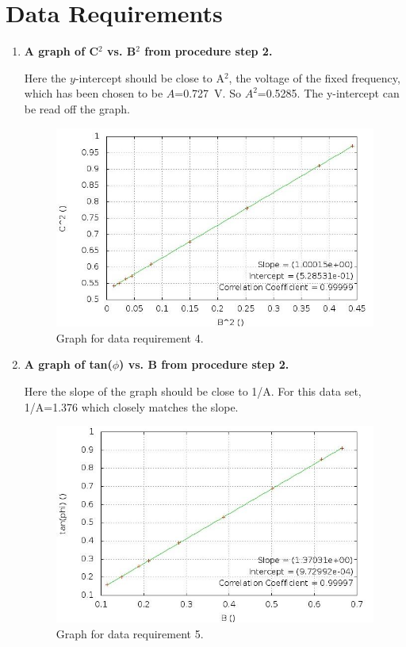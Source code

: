\section{Data Requirements}
\begin{enumerate}[resume]
\item {\bf A graph of C$^2$ vs. B$^2$ from procedure step 2.}\newline

Here the $y$-intercept should be close to A$^2$, the voltage of the fixed frequency, which has been chosen to be $A$=0.727~V. So $A^2$=0.5285. The y-intercept can be read off the graph.

\begin{figure}[ht]
\includegraphics{FS-datareq4.jpg}
\caption{Graph for data requirement 4.}
\label{fig:fscg1}
\end{figure}\vspace{-10mm}

\item {\bf A graph of tan($\phi$) vs. B from procedure step 2.}\newline

Here the slope of the graph should be close to 1/A. For this data set, 1/A=1.376 which closely matches the slope.

\begin{figure}[ht]
\includegraphics{FS-datareq5.jpg}
\caption{Graph for data requirement 5.}
\label{fig:fscg2}
\end{figure}


\end{enumerate}
